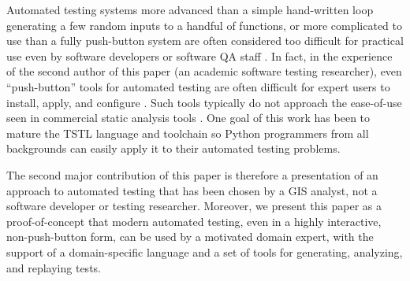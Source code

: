 Automated testing systems more advanced than a simple hand-written loop generating 
a few random inputs to a handful of functions, or more complicated to 
use than a fully push-button system are often considered too difficult 
for practical use even by software developers or software QA staff \cite{ISSRE}.
In fact, in the experience of the second author of this paper (an
academic software testing researcher), even ``push-button'' tools for
automated testing are often difficult for expert users to install, apply, and
configure \cite{AMAI,CFV08,ISSRE}.  Such tools typically do not approach the ease-of-use seen
in commercial static analysis tools \cite{Coverity,Klocwork,CodeSonar}.  One goal of this work
has been to mature the TSTL language and toolchain so Python
programmers from all backgrounds can easily apply it to their
automated testing problems.

The second major contribution of this paper is therefore a presentation of an
approach to automated testing that has been chosen by a GIS analyst, not a
software developer or testing researcher.  Moreover, we present this
paper as a proof-of-concept that modern automated testing, even in a
highly interactive, non-push-button form, can be used by a motivated
domain expert, with the support of  a domain-specific language
\cite{Fow10} and a set of tools for generating, analyzing, and replaying tests.



